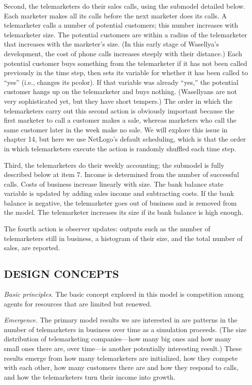 \documentclass[]{article}
\begin{document}
Second, the telemarketers do their sales calls, using the submodel
detailed below. Each marketer makes all its calls before the next
marketer does its calls. A telemarketer calls a number of potential
customers; this number increases with telemarketer size. The potential
customers are within a radius of the telemarketer that increases with
the marketer's size. (In this early stage of Wasellya's development, the
cost of phone calls increases steeply with their distance.) Each
potential customer buys something from the telemarketer if it has not
been called previously in the time step, then sets its variable for
whether it has been called to ``yes'' (i.e., changes its pcolor). If
that variable was already ``yes,'' the potential customer hangs up on
the telemarketer and buys nothing. (Wasellyans are not very
sophisticated yet, but they have short tempers.) The order in which the
telemarketers carry out this second action is obviously important
because the first marketer to call a customer makes a sale, whereas
marketers who call the same customer later in the week make no sale. We
will explore this issue in chapter 14, but here we use NetLogo's default
scheduling, which is that the order in which telemarketers execute the
action is randomly shuffled each time step.

Third, the telemarketers do their weekly accounting; the submodel is
fully described below at item 7. Income is determined from the number of
successful calls. Costs of business increase linearly with size. The
bank balance state variable is updated by adding sales income and
subtracting costs. If the bank balance is negative, the telemarketer
goes out of business and is removed from the model. The telemarketer
increases its size if its bank balance is high enough.

The fourth action is observer updates: outputs such as the number of
telemarketers still in business, a histogram of their size, and the
total number of sales, are reported.

\hypertarget{design-concepts}{%
\subsection{DESIGN CONCEPTS}\label{design-concepts}}

\emph{Basic principles.} The basic concept explored in this model is
competition among agents for resources that are limited but renewed.

\emph{Emergence.} The primary model results we are interested in are
patterns in the number of telemarketers in business over time as a
simulation proceeds. (The size distribution of telemarketing
companies---how many big ones and how many small ones there are, over
time---is another potentially interesting result.) These results emerge
from how many telemarketers are initialized, how they compete with each
other, how many customers there are and how they respond to calls, and
how the telemarketers turn their income into growth.
\end{document}
